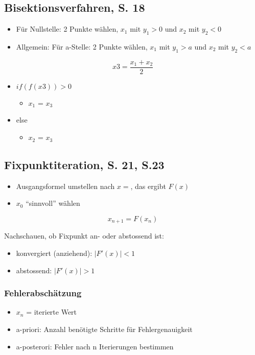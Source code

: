 \subsection{Bisektionsverfahren, S. 18}

\begin{itemize}
\item Für Nullstelle: 2 Punkte wählen, $x_1$ mit $y_1 > 0$ und $x_2$ mit $y_2 < 0$
\item Allgemein: Für a-Stelle: 2 Punkte wählen, $x_1$ mit $y_1 > a$ und $x_2$ mit $y_2 < a$
\end{itemize}
\[x3 = \frac{x_1 + x_2}{2}\]

\begin{itemize}
\item $if(f(x3)) > 0$
\begin{itemize}
\item $x_1$ = $x_3$
\end{itemize}
\item else
\begin{itemize}
\item $x_2$ = $x_3$
\end{itemize}
\end{itemize}

\subsection{Fixpunktiteration, S. 21, S.23}
\begin{itemize}
\item Ausgangsformel umstellen nach $x = $, das ergibt $F(x)$
\item $x_0$ "`sinnvoll"' wählen
\end{itemize}
\[x_{n+1} = F(x_n)\]

Nachschauen, ob Fixpunkt an- oder abstossend ist:
\begin{itemize}
\item konvergiert (anziehend): $|F'(x)| < 1$
\item abstossend: $|F'(x)| > 1$
\end{itemize}


\subsubsection{Fehlerabschätzung}

\begin{itemize}
\item $x_n$ = iterierte Wert
\item a-priori: Anzahl benötigte Schritte für Fehlergenauigkeit
\item a-posterori: Fehler nach n Iterierungen bestimmen
\end{itemize}

